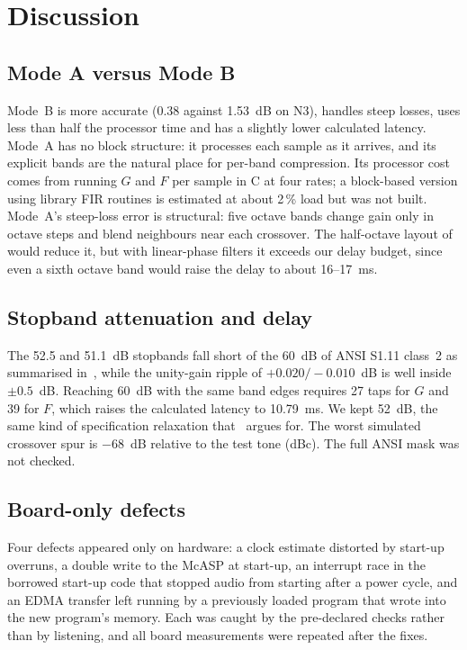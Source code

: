 \documentclass[conference]{IEEEtran}
\begin{document}
\section{Discussion}\label{sec:disc}
\subsection{Mode A versus Mode B}
Mode~B is more accurate (0.38 against 1.53~dB on N3), handles steep losses, uses less than half the processor time and has a slightly lower calculated latency. Mode~A has no block structure: it processes each sample as it arrives, and its explicit bands are the natural place for per-band compression. Its processor cost comes from running $G$ and $F$ per sample in C at four rates; a block-based version using library FIR routines is estimated at about 2\,\% load but was not built. Mode~A's steep-loss error is structural: five octave bands change gain only in octave steps and blend neighbours near each crossover. The half-octave layout of~\cite{sokolova2022} would reduce it, but with linear-phase filters it exceeds our delay budget, since even a sixth octave band would raise the delay to about 16--17~ms.

\subsection{Stopband attenuation and delay}
The 52.5 and 51.1~dB stopbands fall short of the 60~dB of ANSI S1.11 class~2 as summarised in~\cite{yang2016}, while the unity-gain ripple of $+0.020/-0.010$~dB is well inside $\pm0.5$~dB. Reaching 60~dB with the same band edges requires 27 taps for $G$ and 39 for $F$, which raises the calculated latency to 10.79~ms. We kept 52~dB, the same kind of specification relaxation that~\cite{yang2016} argues for. The worst simulated crossover spur is $-68$~dB relative to the test tone (dBc). The full ANSI mask was not checked.

\subsection{Board-only defects}
Four defects appeared only on hardware: a clock estimate distorted by start-up overruns, a double write to the McASP at start-up, an interrupt race in the borrowed start-up code that stopped audio from starting after a power cycle, and an EDMA transfer left running by a previously loaded program that wrote into the new program's memory. Each was caught by the pre-declared checks rather than by listening, and all board measurements were repeated after the fixes.
\end{document}
